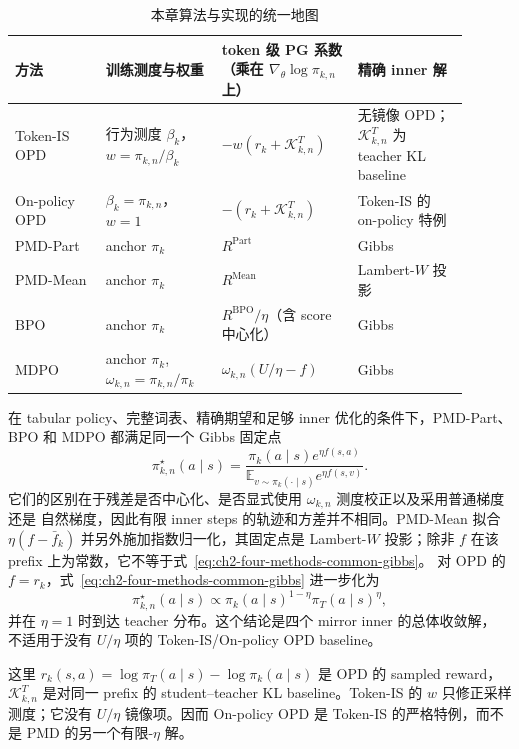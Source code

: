 \begin{table}[ht]
\centering
\caption{本章算法与实现的统一地图}
\label{tab:ch2-opd-baseline-map}
\begin{tabular}{p{0.18\linewidth}p{0.23\linewidth}p{0.27\linewidth}p{0.22\linewidth}}
\toprule
方法 & 训练测度与权重 & token 级 PG 系数（乘在 $\nabla_\theta\log\pi_{k,n}$ 上） & 精确 inner 解 \\
\midrule
Token-IS OPD & 行为测度 $\beta_k$，$w=\pi_{k,n}/\beta_k$ & $-w(r_k+\mathcal K_{k,n}^{T})$ & 无镜像 OPD；$\mathcal K_{k,n}^{T}$ 为 teacher KL baseline \\
On-policy OPD & $\beta_k=\pi_{k,n}$，$w=1$ & $-(r_k+\mathcal K_{k,n}^{T})$ & Token-IS 的 on-policy 特例 \\
PMD-Part & anchor $\pi_k$ & $R^{\mathrm{Part}}$ & Gibbs \\
PMD-Mean & anchor $\pi_k$ & $R^{\mathrm{Mean}}$ & Lambert-$W$ 投影 \\
BPO & anchor $\pi_k$ & $R^{\mathrm{BPO}}/\eta$（含 score 中心化） & Gibbs \\
MDPO & anchor $\pi_k$,$\omega_{k,n}=\pi_{k,n}/\pi_k$ & $\omega_{k,n}(U/\eta-f)$ & Gibbs \\
\bottomrule
\end{tabular}
\end{table}

在 tabular policy、完整词表、精确期望和足够 inner 优化的条件下，PMD-Part、BPO
和 MDPO 都满足同一个 Gibbs 固定点
\begin{equation}
\label{eq:ch2-four-methods-common-gibbs}
\pi_{k,n}^{\star}(a\mid s)
=\frac{\pi_k(a\mid s)e^{\eta f(s,a)}}{\mathbb E_{v\sim\pi_k(\cdot\mid s)}e^{\eta f(s,v)}}.
\end{equation}
它们的区别在于残差是否中心化、是否显式使用 $\omega_{k,n}$ 测度校正以及采用普通梯度还是
自然梯度，因此有限 inner steps 的轨迹和方差并不相同。PMD-Mean 拟合
$\eta(f-\bar f_k)$ 并另外施加指数归一化，其固定点是 Lambert-$W$ 投影；除非
$f$ 在该 prefix 上为常数，它不等于式~\eqref{eq:ch2-four-methods-common-gibbs}。
对 OPD 的 $f=r_k$，式~\eqref{eq:ch2-four-methods-common-gibbs} 进一步化为
\begin{equation}
\pi_{k,n}^{\star}(a\mid s)
\propto \pi_k(a\mid s)^{1-\eta}\pi_T(a\mid s)^{\eta},
\end{equation}
并在 $\eta=1$ 时到达 teacher 分布。这个结论是四个 mirror inner 的总体收敛解，
不适用于没有 $U/\eta$ 项的 Token-IS/On-policy OPD baseline。

这里 $r_k(s,a)=\log\pi_T(a\mid s)-\log\pi_k(a\mid s)$ 是 OPD 的 sampled
reward，$\mathcal K_{k,n}^{T}$ 是对同一 prefix 的 student--teacher KL baseline。Token-IS
的 $w$ 只修正采样测度；它没有 $U/\eta$ 镜像项。因而 On-policy OPD 是 Token-IS
的严格特例，而不是 PMD 的另一个有限-$\eta$ 解。


